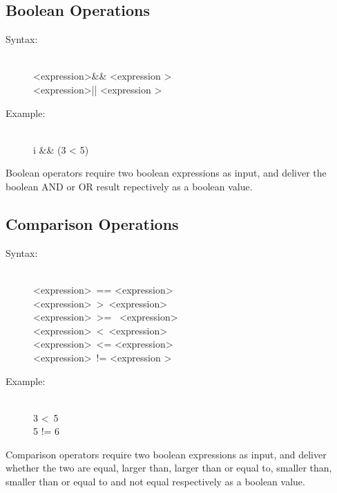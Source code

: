 \documentclass[10pt,a4paper]{report}
\begin{document}
\subsection{Boolean Operations}
\begin{description}
	\item[Syntax:] \hfill \\ 
		\textless expression\textgreater \&\& \textless expression \textgreater \\
		\textless expression\textgreater || \textless expression \textgreater
	\item[Example:] \hfill \\
		i \&\& (3 < 5)
\end{description}
Boolean operators require two boolean expressions as input, and deliver the boolean AND or OR result repectively as a boolean value.

\subsection{Comparison Operations}
\begin{description}
	\item[Syntax:] \hfill \\ 
		\textless expression\textgreater ~== \textless expression\textgreater \\
		\textless expression\textgreater ~\textgreater ~\textless expression\textgreater \\
		\textless expression\textgreater ~\textgreater = ~\textless expression\textgreater \\
		\textless expression\textgreater ~\textless ~\textless expression\textgreater \\
		\textless expression\textgreater ~\textless = \textless expression\textgreater \\
		\textless expression\textgreater ~!= \textless expression \textgreater
	\item[Example:] \hfill \\
		3 \textless ~5 \\
		5 != 6
		
\end{description}
Comparison operators require two boolean expressions as input, and deliver whether the two are equal, larger than, larger than or equal to, smaller than, smaller than or equal to and not equal respectively as a boolean value.
\end{document}
